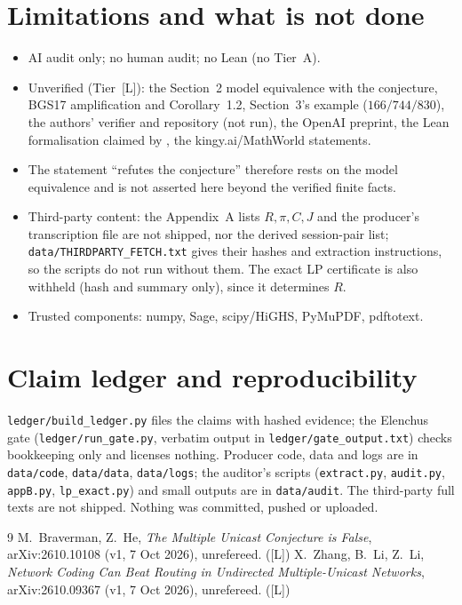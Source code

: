 \documentclass[10pt]{article}
\newcommand{\tier}[1]{\textsf{[#1]}}
\newcommand{\tL}{\tier{L}}
\begin{document}
\section{Limitations and what is not done}\label{sec:lim}
\begin{itemize}\itemsep=1pt
\item AI audit only; no human audit; no Lean (no Tier~A).
\item Unverified (Tier~\tL{}): the Section~2 model equivalence with the conjecture, BGS17 amplification and Corollary~1.2, Section~3's example ($166/744/830$), the authors' verifier and repository (not run), the OpenAI preprint, the Lean formalisation claimed by \cite{zll}, the kingy.ai/MathWorld statements.
\item The statement ``refutes the conjecture'' therefore rests on the model equivalence and is not asserted here beyond the verified finite facts.
\item Third-party content: the Appendix~A lists $R,\pi,C,J$ and the producer's transcription file are not shipped, nor the derived session-pair list; \texttt{data/THIRDPARTY\_FETCH.txt} gives their hashes and extraction instructions, so the scripts do not run without them. The exact LP certificate is also withheld (hash and summary only), since it determines $R$.
\item Trusted components: numpy, Sage, scipy/HiGHS, PyMuPDF, pdftotext.
\end{itemize}

\section{Claim ledger and reproducibility}\label{sec:ledger}
\texttt{ledger/build\_ledger.py} files the claims with hashed evidence; the Elenchus gate (\texttt{ledger/run\_gate.py}, verbatim output in \texttt{ledger/gate\_output.txt}) checks bookkeeping only and licenses nothing. Producer code, data and logs are in \texttt{data/code}, \texttt{data/data}, \texttt{data/logs}; the auditor's scripts (\texttt{extract.py}, \texttt{audit.py}, \texttt{appB.py}, \texttt{lp\_exact.py}) and small outputs are in \texttt{data/audit}. The third-party full texts are not shipped. Nothing was committed, pushed or uploaded.

\begin{thebibliography}{9}\small
{} M.\ Braverman, Z.\ He, \emph{The Multiple Unicast Conjecture is False}, arXiv:2610.10108 (v1, 7 Oct 2026), unrefereed. (\tL)
 X.\ Zhang, B.\ Li, Z.\ Li, \emph{Network Coding Can Beat Routing in Undirected Multiple-Unicast Networks}, arXiv:2610.09367 (v1, 7 Oct 2026), unrefereed. (\tL)
\end{thebibliography}
\end{document}
